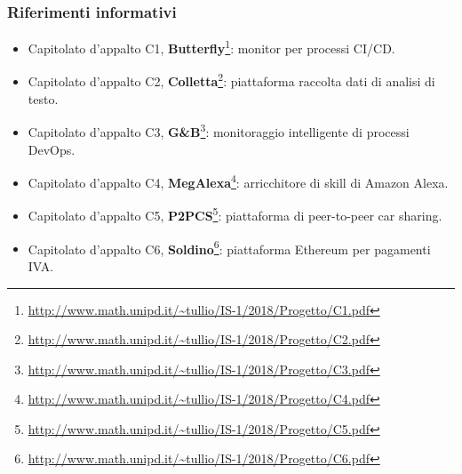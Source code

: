         \subsubsection{Riferimenti informativi}
            \begin{itemize}
                \item Capitolato d'appalto C1, \textbf{Butterfly}\footnote{\url{http://www.math.unipd.it/~tullio/IS-1/2018/Progetto/C1.pdf}}:
                    monitor per processi CI/CD.
                \item Capitolato d'appalto C2, \textbf{Colletta}\footnote{\url{http://www.math.unipd.it/~tullio/IS-1/2018/Progetto/C2.pdf}}:
                    piattaforma raccolta dati di analisi di testo.
                \item Capitolato d'appalto C3, \textbf{G\&B}\footnote{\url{http://www.math.unipd.it/~tullio/IS-1/2018/Progetto/C3.pdf}}:
                    monitoraggio intelligente di processi DevOps.
                \item Capitolato d'appalto C4, \textbf{MegAlexa}\footnote{\url{http://www.math.unipd.it/~tullio/IS-1/2018/Progetto/C4.pdf}}:
                    arricchitore di skill di Amazon Alexa.
                \item Capitolato d'appalto C5, \textbf{P2PCS}\footnote{\url{http://www.math.unipd.it/~tullio/IS-1/2018/Progetto/C5.pdf}}:
                    piattaforma di peer-to-peer car sharing.
                \item Capitolato d'appalto C6, \textbf{Soldino}\footnote{\url{http://www.math.unipd.it/~tullio/IS-1/2018/Progetto/C6.pdf}}:
                    piattaforma Ethereum per pagamenti IVA.
            \end{itemize}

